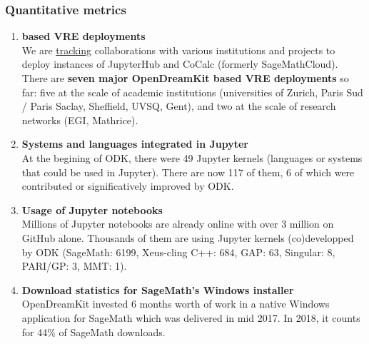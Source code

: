 \subsubsection{Quantitative metrics}
\begin{enumerate}
\item \textbf{\ODK based VRE deployments}\\
  We are
  \href{https://github.com/OpenDreamKit/OpenDreamKit/issues/174}{tracking}
  collaborations with various institutions and projects to deploy
  instances of JupyterHub and CoCalc (formerly SageMathCloud). There
  are \textbf{seven major OpenDreamKit based VRE deployments} so far:
  five at the scale of academic institutions (universities of Zurich,
  Paris Sud / Paris Saclay, Sheffield, UVSQ, Gent), and two at the
  scale of research networks (EGI, Mathrice).

\item \textbf{Systems and languages integrated in Jupyter}\\
  At the begining of ODK, there were 49 Jupyter kernels (languages or
  systems that could be used in Jupyter). There are now 117 of them, 6
  of which were contributed or significatively improved by ODK.
\item \textbf{Usage of Jupyter notebooks}\\
  Millions of Jupyter notebooks are already online with over 3 million
  on GitHub alone. Thousands of them are using Jupyter kernels
  (co)developped by ODK (SageMath: 6199, Xeus-cling C++: 684, GAP: 63,
  Singular: 8, PARI/GP: 3, MMT: 1).

\item \textbf{Download statistics for SageMath's Windows installer}\\
  OpenDreamKit invested 6 months worth of work in a native Windows
  application for SageMath which was delivered in mid 2017. In 2018,
  it counts for 44\% of SageMath downloads.


\end{enumerate}
